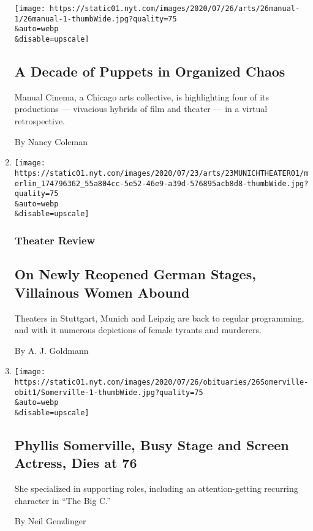 \begin{enumerate}
  \texttt{[image: https://static01.nyt.com/images/2020/07/26/arts/26manual-1/26manual-1-thumbWide.jpg?quality=75\\\&auto=webp\\\&disable=upscale]}

  \hypertarget{a-decade-of-puppets-in-organized-chaos}{%
  \subsection{A Decade of Puppets in Organized
  Chaos}\label{a-decade-of-puppets-in-organized-chaos}}

  Manual Cinema, a Chicago arts collective, is highlighting four of its
  productions --- vivacious hybrids of film and theater --- in a virtual
  retrospective.

  By Nancy Coleman
\item
  \href{/2020/07/23/theater/german-theater-post-lockdown.html}{}

  \texttt{[image: https://static01.nyt.com/images/2020/07/23/arts/23MUNICHTHEATER01/merlin\_174796362\_55a804cc-5e52-46e9-a39d-576895acb8d8-thumbWide.jpg?quality=75\\\&auto=webp\\\&disable=upscale]}

  \hypertarget{theater-review}{%
  \subsubsection{Theater Review}\label{theater-review}}

  \hypertarget{on-newly-reopened-german-stages-villainous-women-abound}{%
  \subsection{On Newly Reopened German Stages, Villainous Women
  Abound}\label{on-newly-reopened-german-stages-villainous-women-abound}}

  Theaters in Stuttgart, Munich and Leipzig are back to regular
  programming, and with it numerous depictions of female tyrants and
  murderers.

  By A. J. Goldmann
\item
  \href{/2020/07/22/arts/television/phyllis-somerville-dead.html}{}

  \texttt{[image: https://static01.nyt.com/images/2020/07/26/obituaries/26Somerville-obit1/Somerville-1-thumbWide.jpg?quality=75\\\&auto=webp\\\&disable=upscale]}

  \hypertarget{phyllis-somerville-busy-stage-and-screen-actress-dies-at-76}{%
  \subsection{Phyllis Somerville, Busy Stage and Screen Actress, Dies at
  76}\label{phyllis-somerville-busy-stage-and-screen-actress-dies-at-76}}

  She specialized in supporting roles, including an attention-getting
  recurring character in ``The Big C.''

  By Neil Genzlinger
\end{enumerate}

